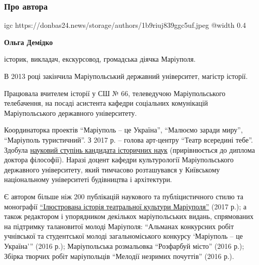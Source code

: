  
 
 
 
 

\clearpage

\subsubsection{Про автора}

\begingroup
\small

\ifcmt
  igc https://donbas24.news/storage/authors/1b9riuj839ggc5uf.jpeg
  @width 0.4
\fi

\textbf{Ольга Демідко}


історик, викладач, екскурсовод, громадська діячка Маріуполя.

В 2013 році закінчила Маріупольський державний університет, магістр історії.

Працювала вчителем історії у СШ № 66, телеведучою Маріупольського телебачення,
на посаді асистента кафедри соціальних комунікацій Маріупольського державного
університету.

Координаторка проектів \enquote{Маріуполь – це Україна}, \enquote{Малюємо
заради миру}, \enquote{Маріуполь туристичний}. З 2017 р. – голова арт-центру
\enquote{Театр всередині тебе}.  Здобула
\href{https://archive.org/details/book.2019.olga_demidko.dissertacia}{науковий
ступінь кандидата історичних наук} (прирівнюється до диплома доктора
філософії). Наразі доцент кафедри культурології Маріупольського державного
університету, який тимчасово розташувався у Київському національному
університеті будівництва і архітектури.

Є автором більше ніж 200 публікацій наукового та публіцистичного стилю та монографії
\href{https://archive.org/details/book.2017.olga_demidko.iljustrovana_istoria_teatralnoi_kultury_mariupolja}{%
\enquote{Ілюстрована історія театральної культури Маріуполя}} (2017 р.); а також
редактором і упорядником декількох маріупольських видань, спрямованих на
підтримку талановитої молоді Маріуполя: \enquote{Альманах конкурсних робіт учнівської
та студентської молоді загальноміського конкурсу \enquote{Маріуполь – це Україна}} (2016
р.); Маріупольська розмальовка \enquote{Розфарбуй місто} (2016 р.); Збірка творчих
робіт маріупольців \enquote{Мелодії незримих почуттів} (2016 р.). 

